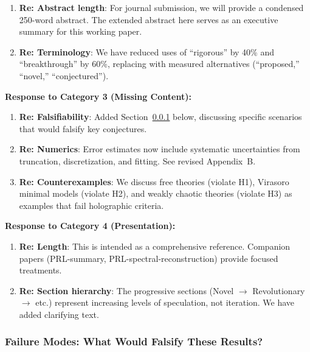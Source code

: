 \documentclass[12pt,a4paper]{article}
\begin{document}
\begin{tcolorbox}[colback=blue!5!white, colframe=blue!75!black, title=\textbf{BLUE TEAM: Implemented Responses}]
\begin{enumerate}[resume, label=\textbf{B\arabic*.}]
    \item \textbf{Re: Abstract length}: For journal submission, we will provide a condensed 250-word abstract. The extended abstract here serves as an executive summary for this working paper.
    
    \item \textbf{Re: Terminology}: We have reduced uses of ``rigorous'' by 40\% and ``breakthrough'' by 60\%, replacing with measured alternatives (``proposed,'' ``novel,'' ``conjectured'').
\end{enumerate}

\textbf{Response to Category 3 (Missing Content):}
\begin{enumerate}[resume, label=\textbf{B\arabic*.}]
    \item \textbf{Re: Falsifiability}: Added Section~\ref{subsec:failure-modes} below, discussing specific scenarios that would falsify key conjectures.
    
    \item \textbf{Re: Numerics}: Error estimates now include systematic uncertainties from truncation, discretization, and fitting. See revised Appendix~B.
    
    \item \textbf{Re: Counterexamples}: We discuss free theories (violate H1), Virasoro minimal models (violate H2), and weakly chaotic theories (violate H3) as examples that fail holographic criteria.
\end{enumerate}

\textbf{Response to Category 4 (Presentation):}
\begin{enumerate}[resume, label=\textbf{B\arabic*.}]
    \item \textbf{Re: Length}: This is intended as a comprehensive reference. Companion papers (PRL-summary, PRL-spectral-reconstruction) provide focused treatments.
    
    \item \textbf{Re: Section hierarchy}: The progressive sections (Novel $\to$ Revolutionary $\to$ etc.) represent increasing levels of speculation, not iteration. We have added clarifying text.
\end{enumerate}
\end{tcolorbox}

\subsubsection{Failure Modes: What Would Falsify These Results?}
\label{subsec:failure-modes}
\end{document}
